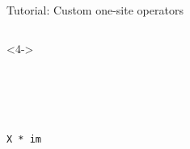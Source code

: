 \begin{frame}[fragile]{Tutorial: Custom one-site operators}
\begin{columns}
\begin{column}{4.5cm}
\begin{onlyenv}<4->
~\\
~\\
~\\
~\\
~\\
\begin{lstlisting}[language=JuliaLocal, style=julia, basicstyle=\small]
X * im
\end{lstlisting}
\end{onlyenv}

\end{column}

\end{columns}

\end{frame}
